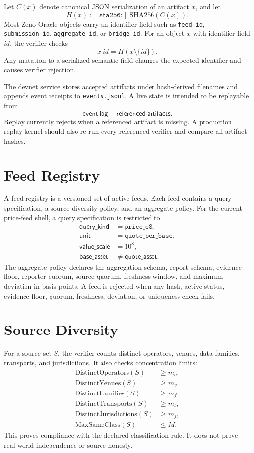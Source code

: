 \documentclass[11pt]{article}
\begin{document}
Let \(C(x)\) denote canonical JSON serialization of an artifact \(x\), and let
\[
  H(x) := \texttt{sha256:} \parallel \mathrm{SHA256}(C(x)).
\]
Most Zeno Oracle objects carry an identifier field such as
\texttt{feed\_id}, \texttt{submission\_id}, \texttt{aggregate\_id}, or
\texttt{bridge\_id}. For an object \(x\) with identifier field \(id\), the
verifier checks
\[
  x.id = H(x \setminus \{id\}).
\]
Any mutation to a serialized semantic field changes the expected identifier
and causes verifier rejection.

The devnet service stores accepted artifacts under hash-derived filenames and
appends event receipts to \texttt{events.jsonl}. A live state is intended to be
replayable from
\[
  \mathsf{event\ log} + \mathsf{referenced\ artifacts}.
\]
Replay currently rejects when a referenced artifact is missing. A production
replay kernel should also re-run every referenced verifier and compare all
artifact hashes.

\section{Feed Registry}

A feed registry is a versioned set of active feeds. Each feed contains a query
specification, a source-diversity policy, and an aggregate policy. For the
current price-feed shell, a query specification is restricted to
\[
\begin{aligned}
  \mathsf{query\_kind} &= \texttt{price\_e8},\\
  \mathsf{unit} &= \texttt{quote\_per\_base},\\
  \mathsf{value\_scale} &= 10^8,\\
  \mathsf{base\_asset} &\neq \mathsf{quote\_asset}.
\end{aligned}
\]
The aggregate policy declares the aggregation schema, report schema, evidence
floor, reporter quorum, source quorum, freshness window, and maximum deviation
in basis points. A feed is rejected when any hash, active-status,
evidence-floor, quorum, freshness, deviation, or uniqueness check fails.

\section{Source Diversity}

For a source set \(S\), the verifier counts distinct operators, venues, data
families, transports, and jurisdictions. It also checks concentration limits:
\[
\begin{aligned}
  \mathrm{DistinctOperators}(S) &\geq m_o,\\
  \mathrm{DistinctVenues}(S) &\geq m_v,\\
  \mathrm{DistinctFamilies}(S) &\geq m_f,\\
  \mathrm{DistinctTransports}(S) &\geq m_t,\\
  \mathrm{DistinctJurisdictions}(S) &\geq m_j,\\
  \mathrm{MaxSameClass}(S) &\leq M.
\end{aligned}
\]
This proves compliance with the declared classification rule. It does not
prove real-world independence or source honesty.
\end{document}

